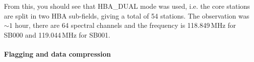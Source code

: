 % 
% 
% 
% 
% 
%   


From this, you should see that  HBA\_DUAL mode was used, i.e. the core stations are split in two HBA sub-fields, giving a total of 54 stations. The observation was $\sim1$ hour, there are 64 spectral channels and the frequency is 118.849\,MHz for SB000 and  119.044\,MHz for SB001. %


\paragraph{Flagging and data compression}\mbox{}\\

